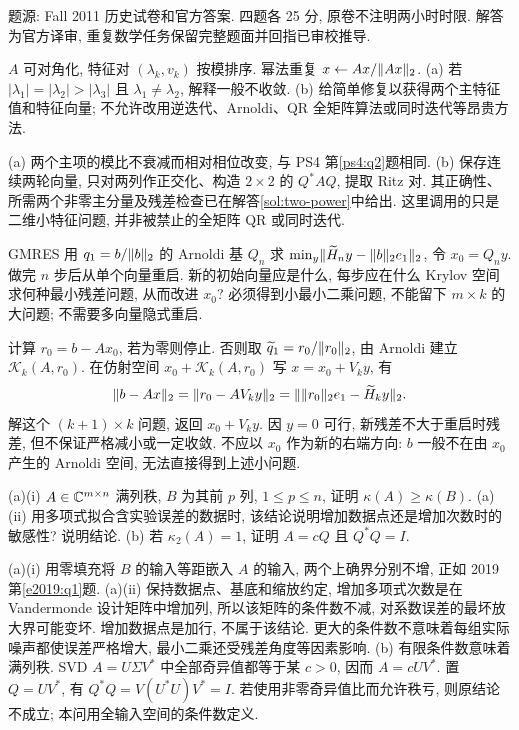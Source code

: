 题源: Fall 2011 历史试卷和官方答案. 四题各 25 分, 原卷不注明两小时时限. 解答为官方译审, 重复数学任务保留完整题面并回指已审校推导.
\begin{exercise}\label{e2011:q1}
$A$ 可对角化, 特征对 $(\lambda_k,v_k)$ 按模排序. 幂法重复 $x\leftarrow Ax/\lVert Ax\rVert_2$.
(a) 若 $|\lambda_1|=|\lambda_2|>|\lambda_3|$ 且 $\lambda_1\ne\lambda_2$, 解释一般不收敛.
(b) 给简单修复以获得两个主特征值和特征向量; 不允许改用逆迭代、Arnoldi、QR 全矩阵算法或同时迭代等昂贵方法.
\end{exercise}
\begin{solution}
(a) 两个主项的模比不衰减而相对相位改变, 与 PS4 第\ref{ps4:q2}题相同.
(b) 保存连续两轮向量, 只对两列作正交化、构造 $2\times2$ 的 $Q^*AQ$, 提取 Ritz 对. 其正确性、所需两个非零主分量及残差检查已在解答\ref{sol:two-power}中给出. 这里调用的只是二维小特征问题, 并非被禁止的全矩阵 QR 或同时迭代.
\end{solution}
\begin{exercise}\label{e2011:q2}
GMRES 用 $q_1=b/\lVert b\rVert_2$ 的 Arnoldi 基 $Q_n$ 求 $\min_y\lVert \widetilde H_ny-\lVert b\rVert_2e_1\rVert_2$, 令 $x_0=Q_ny$. 做完 $n$ 步后从单个向量重启. 新的初始向量应是什么, 每步应在什么 Krylov 空间求何种最小残差问题, 从而改进 $x_0$? 必须得到小最小二乘问题, 不能留下 $m\times k$ 的大问题; 不需要多向量隐式重启.
\end{exercise}
\begin{solution}
计算 $r_0=b-Ax_0$, 若为零则停止. 否则取 $\widetilde q_1=r_0/\lVert r_0\rVert_2$, 由 Arnoldi 建立 $\mathcal K_k(A,r_0)$. 在仿射空间 $x_0+\mathcal K_k(A,r_0)$ 写 $x=x_0+V_ky$, 有
\[
 \lVert b-Ax\rVert_2=\lVert r_0-AV_ky\rVert_2
 =\lVert \lVert r_0\rVert_2 e_1-\widetilde H_ky\rVert_2.
\]
解这个 $(k+1)\times k$ 问题, 返回 $x_0+V_ky$. 因 $y=0$ 可行, 新残差不大于重启时残差, 但不保证严格减小或一定收敛. 不应以 $x_0$ 作为新的右端方向: $b$ 一般不在由 $x_0$ 产生的 Arnoldi 空间, 无法直接得到上述小问题.
\end{solution}
\begin{exercise}\label{e2011:q3}
(a)(i) $A\in\mathbb C^{m\times n}$ 满列秩, $B$ 为其前 $p$ 列, $1\le p\le n$, 证明 $\kappa(A)\ge\kappa(B)$.
(a)(ii) 用多项式拟合含实验误差的数据时, 该结论说明增加数据点还是增加次数时的敏感性? 说明结论.
(b) 若 $\kappa_2(A)=1$, 证明 $A=cQ$ 且 $Q^*Q=I$.
\end{exercise}
\begin{solution}
(a)(i) 用零填充将 $B$ 的输入等距嵌入 $A$ 的输入, 两个上确界分别不增, 正如 2019 第\ref{e2019:q1}题.
(a)(ii) 保持数据点、基底和缩放约定, 增加多项式次数是在 Vandermonde 设计矩阵中增加列, 所以该矩阵的条件数不减, 对系数误差的最坏放大界可能变坏. 增加数据点是加行, 不属于该结论. 更大的条件数不意味着每组实际噪声都使误差严格增大, 最小二乘还受残差角度等因素影响.
(b) 有限条件数意味着满列秩. SVD $A=U\Sigma V^*$ 中全部奇异值都等于某 $c>0$, 因而 $A=cUV^*$. 置 $Q=UV^*$, 有 $Q^*Q=V(U^*U)V^*=I$. 若使用非零奇异值比而允许秩亏, 则原结论不成立; 本问用全输入空间的条件数定义.
\end{solution}
